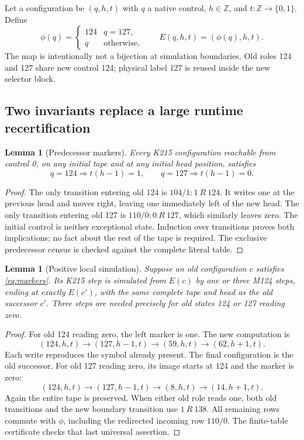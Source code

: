 \documentclass[11pt]{article}
\newtheorem{lemma}[theorem]{Lemma}
\theoremstyle{remark}\newtheorem{remark}[theorem]{Remark}
\newcommand{\Z}{\mathbb Z}
\newcommand{\bits}{\{0,1\}}
\begin{document}
Let a configuration be $(q,h,t)$ with $q$ a native control, $h\in\Z$, and $t:\Z\to\bits$. Define
\[
 \phi(q)=\begin{cases}124&q=127,\\q&\text{otherwise},\end{cases}
 \qquad E(q,h,t)=(\phi(q),h,t).
\]
The map is intentionally not a bijection at simulation boundaries. Old roles 124 and 127 share new control 124; physical label 127 is reused inside the new selector block.

\subsection{Two invariants replace a large runtime recertification}

\begin{lemma}[Predecessor markers]\label{lem:markers}
Every K215 configuration reachable from control 0, on any initial tape and at any initial head position, satisfies
\begin{equation}\label{eq:markers}
 q=124\Longrightarrow t(h-1)=1,
 \qquad
 q=127\Longrightarrow t(h-1)=0.
\end{equation}
\end{lemma}
\begin{proof}
The only transition entering old 124 is $104/1:1\ R\ 124$. It writes one at the previous head and moves right, leaving one immediately left of the new head. The only transition entering old 127 is $110/0:0\ R\ 127$, which similarly leaves zero. The initial control is neither exceptional state. Induction over transitions proves both implications; no fact about the rest of the tape is required. The exclusive predecessor census is checked against the complete literal table.
\end{proof}

\begin{lemma}[Positive local simulation]\label{lem:step}
Suppose an old configuration $c$ satisfies \eqref{eq:markers}. Its K215 step is simulated from $E(c)$ by one or three M124 steps, ending at exactly $E(c')$, with the same complete tape and head as the old successor $c'$. Three steps are needed precisely for old states 124 or 127 reading zero.
\end{lemma}
\begin{proof}
For old 124 reading zero, the left marker is one. The new computation is
\[
 (124,h,t)\longrightarrow(127,h-1,t)
 \longrightarrow(59,h,t)\longrightarrow(62,h+1,t).
\]
Each write reproduces the symbol already present. The final configuration is the old successor. For old 127 reading zero, its image starts at 124 and the marker is zero:
\[
 (124,h,t)\longrightarrow(127,h-1,t)
 \longrightarrow(8,h,t)\longrightarrow(14,h+1,t).
\]
Again the entire tape is preserved. When either old role reads one, both old transitions and the new boundary transition use $1\ R\ 138$. All remaining rows commute with $\phi$, including the redirected incoming row $110/0$. The finite-table certificate checks that last universal assertion.
\end{proof}
\end{document}
